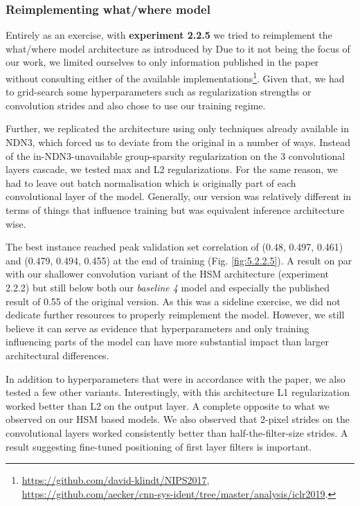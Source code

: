 \subsubsection{Reimplementing what/where model}

Entirely as an exercise, with \textbf{experiment 2.2.5} we tried to reimplement the what/\-where model architecture as introduced by \cite{klindt} Due to it not being the focus of our work, we limited ourselves to only information published in the paper without consulting either of the available implementations\footnote{\href{https://github.com/david-klindt/NIPS2017}{https://github.com/david-klindt/NIPS2017}, \\ \href{https://github.com/aecker/cnn-sys-ident/tree/master/analysis/iclr2019}{https://github.com/aecker/cnn-sys-ident/tree/master/analysis/iclr2019}.}. Given that, we had to grid-search some hyperparameters such as regularization strengths or convolution strides and also chose to use our training regime. 

Further, we replicated the architecture using only techniques already available in NDN3, which forced us to deviate from the original in a number of ways. Instead of the in-NDN3-unavailable group-sparsity regularization on the 3 convolutional layers cascade, we tested max and L2 regularizations. For the same reason, we had to leave out batch normalisation which is originally part of each convolutional layer of the model. Generally, our version was relatively different in terms of things that influence training but was equivalent inference architecture wise.

The best instance reached peak validation set correlation of (0.48, 0.497, 0.461) and (0.479, 0.494, 0.455) at the end of training (Fig. \ref{fig:5.2.2.5}). A result on par with our shallower {convolution variant} of the HSM architecture (experiment 2.2.2) but still below both our \textit{baseline 4} model and especially the published result of 0.55 of the original \citeauthor{klindt} version. As this was a sideline exercise, we did not dedicate further resources to properly reimplement the model. However, we still believe it can serve as evidence that hyperparameters and only training influencing parts of the model can have more substantial impact than larger architectural differences.

In addition to hyperparameters that were in accordance with the paper, we also tested a few other variants. Interestingly, with this architecture L1 regularization worked better than L2 on the output layer. A complete opposite to what we observed on our HSM based models. We also observed that 2-pixel strides on the convolutional layers worked consistently better than half-the-filter-size strides. A result suggesting fine-tuned positioning of first layer filters is important.

